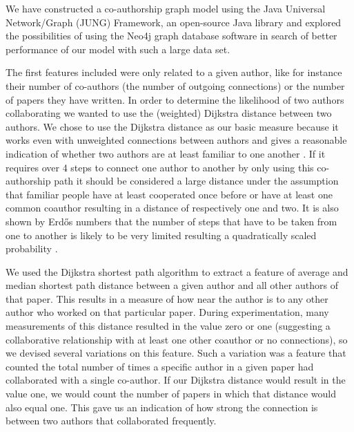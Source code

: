 We have constructed a co-authorship graph model using the Java Universal Network/Graph (JUNG) Framework, an open-source Java library \cite{o2005analysis} and explored the possibilities of using the Neo4j graph database software \cite{rodrigez2010mysql} in search of better performance of our model with such a large data set.

The first features included were only related to a given author, like for instance their number of co-authors (the number of outgoing connections) or the number of papers they have written.
In order to determine the likelihood of two authors collaborating we wanted to use the (weighted) Dijkstra distance between two authors.
We chose to use the Dijkstra distance as our basic measure because it works even with unweighted connections between authors and gives a reasonable indication of whether two authors are at least familiar to one another \cite{o2005analysis}.
If it requires over 4 steps to connect one author to another by only using this co-authorship path it should be considered a large distance under the assumption that familiar people have at least cooperated once before or have at least one common coauthor resulting in a distance of respectively one and two.
It is also shown by Erdős numbers that the number of steps that have to be taken from one to another is likely to be very limited resulting a quadratically scaled probability \cite{balaban2002co}.

We used the Dijkstra shortest path algorithm to extract a feature of average and median shortest path distance between a given author and all other authors of that paper.
This results in a measure of how near the author is to any other author who worked on that particular paper.
During experimentation, many measurements of this distance resulted in the value zero or one (suggesting a collaborative  relationship with at least one other coauthor or no connections), so we devised several variations on this feature.
Such a variation was a feature that counted the total number of times a specific author in a given paper had collaborated with a single co-author.
If our Dijkstra distance would result in the value one, we would count the number of papers in which that distance would also equal one.
This gave us an indication of how strong the connection is between two authors that collaborated frequently.


